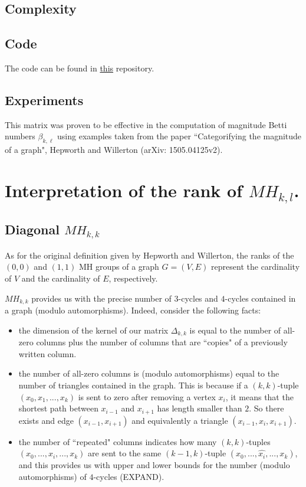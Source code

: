 \documentclass{article}
\begin{document}
	\subsection{Complexity}
	
	\subsection{Code}
	The code can be found in \href{https://github.com/GMenara/magnitude-homology-calculations}{this} repository. 
	
	\subsection{Experiments}
	This matrix was proven to be effective in the computation of magnitude Betti numbers $\beta_{k,\ell}$ using examples taken from the paper ``Categorifying the magnitude of a graph", Hepworth and Willerton (arXiv: 1505.04125v2).  
	
	\section{Interpretation of the rank of $MH_{k,l}$.}
	
	\subsection{Diagonal $MH_{k,k}$}
	As for the original definition given by Hepworth and Willerton, the ranks of the $(0,0)$ and $(1,1)$ MH groups of a graph $G=(V,E)$ represent the cardinality of $V$ and the cardinality of $E$, respectively. 
	\medskip
	
	$MH_{k,k}$ provides us with the precise number of $3$-cycles and $4$-cycles contained in a graph (modulo automorphisms). 
	Indeed, consider the following facts:
	\begin{itemize}
		\item the dimension of the kernel of our matrix $\Delta_{k,k}$ is equal to the number of all-zero columns plus the number of columns that are ``copies" of a previously written column.
		\item the number of all-zero columns is (modulo automorphisms) equal to the number of triangles contained in the graph. This is because if a $(k,k)$-tuple $(x_0,x_1,...,x_k)$ is sent to zero after removing a vertex $x_i$, it means that the shortest path between $x_{i-1}$ and $x_{i+1}$ has length smaller than $2$. So there exists and edge $(x_{i-1},x_{i+1})$ and equivalently a triangle $(x_{i-1},x_i,x_{i+1})$.
		\item the number of ``repeated" columns indicates how many $(k,k)$-tuples $(x_0,...,x_i,...,x_k)$ are sent to the same $(k-1,k)$-tuple $(x_0,...,\hat{x_i},...,x_k)$, and this provides us with upper and lower bounds for the number (modulo automorphisms) of $4$-cycles (EXPAND).
	\end{itemize}
	
\end{document}
